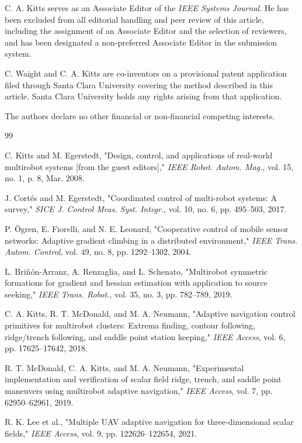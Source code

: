\documentclass[lettersize,journal]{IEEEtran}
\begin{document}
C. A. Kitts serves as an Associate Editor of the \textit{IEEE Systems Journal}. He has been excluded from all editorial handling and peer review of this article, including the assignment of an Associate Editor and the selection of reviewers, and has been designated a non-preferred Associate Editor in the submission system.

C. Waight and C. A. Kitts are co-inventors on a provisional patent application filed through Santa Clara University covering the method described in this article. Santa Clara University holds any rights arising from that application.

The authors declare no other financial or non-financial competing interests.


\begin{thebibliography}{99}

 C. Kitts and M. Egerstedt, "Design, control, and applications of real-world multirobot systems [from the guest editors]," \textit{IEEE Robot. Autom. Mag.}, vol. 15, no. 1, p. 8, Mar. 2008.

 J. Cortés and M. Egerstedt, "Coordinated control of multi-robot systems: A survey," \textit{SICE J. Control Meas. Syst. Integr.}, vol. 10, no. 6, pp. 495--503, 2017.

 P. Ögren, E. Fiorelli, and N. E. Leonard, "Cooperative control of mobile sensor networks: Adaptive gradient climbing in a distributed environment," \textit{IEEE Trans. Autom. Control}, vol. 49, no. 8, pp. 1292--1302, 2004.

 L. Briñón-Arranz, A. Renzaglia, and L. Schenato, "Multirobot symmetric formations for gradient and hessian estimation with application to source seeking," \textit{IEEE Trans. Robot.}, vol. 35, no. 3, pp. 782--789, 2019.

 C. A. Kitts, R. T. McDonald, and M. A. Neumann, "Adaptive navigation control primitives for multirobot clusters: Extrema finding, contour following, ridge/trench following, and saddle point station keeping," \textit{IEEE Access}, vol. 6, pp. 17625--17642, 2018.

 R. T. McDonald, C. A. Kitts, and M. A. Neumann, "Experimental implementation and verification of scalar field ridge, trench, and saddle point maneuvers using multirobot adaptive navigation," \textit{IEEE Access}, vol. 7, pp. 62950--62961, 2019.

 R. K. Lee et al., "Multiple UAV adaptive navigation for three-dimensional scalar fields," \textit{IEEE Access}, vol. 9, pp. 122626--122654, 2021.


\end{thebibliography}
\end{document}
